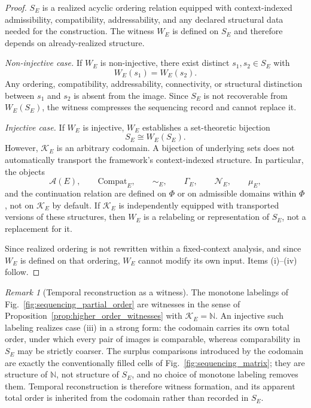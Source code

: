 \documentclass[aps,prx,onecolumn,11pt]{revtex4-2}
\theoremstyle{plain}
\theoremstyle{definition}
\theoremstyle{remark}
\newtheorem{remark}{Remark}
\begin{document}
\begin{proof}
\(S_E\) is a realized acyclic ordering relation equipped with
context-indexed admissibility, compatibility, addressability, and any
declared structural data needed for the construction. The witness
\(W_E\) is defined on \(S_E\) and therefore depends on already-realized
structure.

\emph{Non-injective case.} If \(W_E\) is non-injective, there exist
distinct \(s_1,s_2\in S_E\) with
\[
W_E(s_1)=W_E(s_2).
\]
Any ordering, compatibility, addressability, connectivity, or
structural distinction between \(s_1\) and \(s_2\) is absent from the
image. Since \(S_E\) is not recoverable from \(W_E(S_E)\), the witness
compresses the sequencing record and cannot replace it.

\emph{Injective case.} If \(W_E\) is injective, \(W_E\) establishes a
set-theoretic bijection
\[
S_E\cong W_E(S_E).
\]
However, \(\mathcal K_E\) is an arbitrary codomain. A bijection of
underlying sets does not automatically transport the framework's
context-indexed structure. In particular, the objects
\[
\mathcal A(E),
\qquad
\mathrm{Compat}_E,
\qquad
\sim_E,
\qquad
\Gamma_E,
\qquad
\mathcal N_E,
\qquad
\mu_E,
\]
and the continuation relation are defined on \(\Phi\) or on admissible
domains within \(\Phi\), not on \(\mathcal K_E\) by default. If
\(\mathcal K_E\) is independently equipped with transported versions of
these structures, then \(W_E\) is a relabeling or representation of
\(S_E\), not a replacement for it.

Since realized ordering is not rewritten within a fixed-context
analysis, and since \(W_E\) is defined on that ordering, \(W_E\)
cannot modify its own input. Items (i)--(iv) follow.
\end{proof}

\begin{remark}[Temporal reconstruction as a witness]
\label{rem:temporal_reconstruction_witness}
The monotone labelings of
Fig.~\ref{fig:sequencing_partial_order} are witnesses in the sense of
Proposition~\ref{prop:higher_order_witnesses} with
\(\mathcal K_E=\mathbb N\). An injective such labeling realizes case
(iii) in a strong form: the codomain carries its own total order, under
which every pair of images is comparable, whereas comparability in
\(S_E\) may be strictly coarser. The surplus comparisons introduced by
the codomain are exactly the conventionally filled cells of
Fig.~\ref{fig:sequencing_matrix}; they are structure of \(\mathbb N\),
not structure of \(S_E\), and no choice of monotone labeling removes
them. Temporal reconstruction is therefore witness formation, and its
apparent total order is inherited from the codomain rather than
recorded in \(S_E\).
\end{remark}
\end{document}

